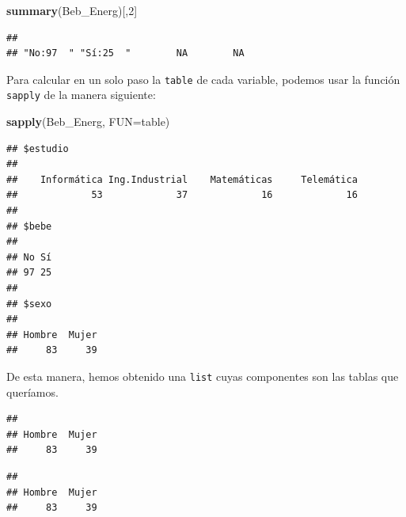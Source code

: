 \documentclass[]{book}
\newenvironment{Shaded}{\begin{snugshade}}{\end{snugshade}}
\newcommand{\DataTypeTok}[1]{\textcolor[rgb]{0.13,0.29,0.53}{#1}}
\newcommand{\DecValTok}[1]{\textcolor[rgb]{0.00,0.00,0.81}{#1}}
\newcommand{\KeywordTok}[1]{\textcolor[rgb]{0.13,0.29,0.53}{\textbf{#1}}}
\newcommand{\NormalTok}[1]{#1}
\newcommand{\OperatorTok}[1]{\textcolor[rgb]{0.81,0.36,0.00}{\textbf{#1}}}
\theoremstyle{definition}
\theoremstyle{definition}
\theoremstyle{definition}
\theoremstyle{remark}
\begin{document}
\begin{Shaded}
\begin{Highlighting}[]
\KeywordTok{summary}\NormalTok{(Beb_Energ)[,}\DecValTok{2}\NormalTok{]}
\end{Highlighting}
\end{Shaded}

\begin{verbatim}
##                                         
## "No:97  " "Sí:25  "        NA        NA
\end{verbatim}

Para calcular en un solo paso la \texttt{table} de cada variable, podemos usar la función \texttt{sapply} de la manera siguiente:

\begin{Shaded}
\begin{Highlighting}[]
\KeywordTok{sapply}\NormalTok{(Beb_Energ, }\DataTypeTok{FUN=}\NormalTok{table)}
\end{Highlighting}
\end{Shaded}

\begin{verbatim}
## $estudio
## 
##    Informática Ing.Industrial    Matemáticas     Telemática 
##             53             37             16             16 
## 
## $bebe
## 
## No Sí 
## 97 25 
## 
## $sexo
## 
## Hombre  Mujer 
##     83     39
\end{verbatim}

De esta manera, hemos obtenido una \texttt{list} cuyas componentes son las tablas que queríamos.

\begin{Shaded}
\end{Shaded}

\begin{verbatim}
## 
## Hombre  Mujer 
##     83     39
\end{verbatim}

\begin{Shaded}
\end{Shaded}

\begin{verbatim}
## 
## Hombre  Mujer 
##     83     39
\end{verbatim}
\end{document}
